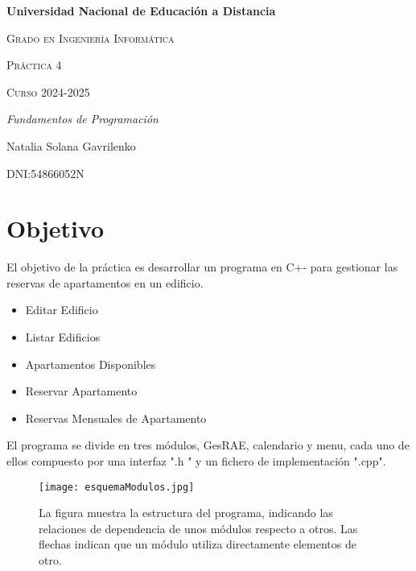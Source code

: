 \documentclass[12pt]{article}
\begin{document}
	\begin{titlepage}
		\centering
		{\bfseries\LARGE Universidad Nacional de Educación a Distancia  \par}
		\vspace{1cm}
		{\scshape\Large Grado en Ingeniería Informática \par}
		\vspace{1cm}
		{\scshape\LARGE Práctica 4 \par}
		\vspace{0.2cm}
		{\scshape\Large Curso 2024-2025 \par}
		\vspace{1.5cm}
		{\itshape\LARGE Fundamentos de Programación\par}
		\vspace{2 cm}
		{\Large Natalia Solana Gavrilenko \par}
		\vspace{0.2cm}
		{\scshape\Large DNI:54866052N \par}
	
	\end{titlepage}
	
	\tableofcontents
	\newpage
	
	\section{\textbf{Objetivo}}
	El objetivo de la práctica es desarrollar un programa en C+- para gestionar las reservas de apartamentos en un edificio.
	
	\begin{itemize}
		\item Editar Edificio
		\item Listar Edificios
		\item Apartamentos Disponibles
		\item Reservar Apartamento
		\item Reservas Mensuales de Apartamento
	\end{itemize}
	
	El programa se divide en tres módulos, GesRAE, calendario y menu, cada uno de ellos compuesto por una interfaz ".h " y un fichero de implementación ".cpp".
	
	\begin{figure}[h]
		\centering
		\texttt{[image: esquemaModulos.jpg]}
		\caption{La figura muestra la estructura del programa, indicando las relaciones de dependencia de unos módulos respecto a otros. Las flechas indican que un módulo utiliza directamente elementos de otro.}
		\label{fig:png}
	\end{figure}
	
\end{document}
